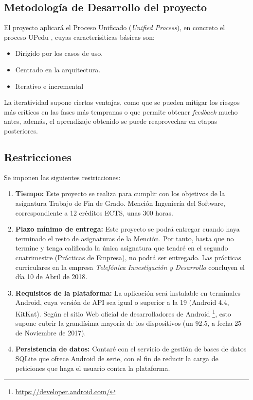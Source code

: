 \documentclass[twoside]{report}
\begin{document}
\subsection{Metodología de Desarrollo del proyecto}
El proyecto aplicará el Proceso Unificado (\textit{Unified Process}), en concreto el proceso UPedu \cite{upedu}, cuyas caracterísiticas básicas \cite{pgpup} son: 
\begin{itemize}
\item Dirigido por los casos de uso.
\item Centrado en la arquitectura.
\item Iterativo e incremental
\end{itemize}
La iteratividad supone ciertas ventajas, como que se pueden mitigar los riesgos más críticos en las fases más tempranas o que permite obtener \textit{feedback} mucho antes, además, el aprendizaje obtenido se puede reaprovechar en etapas posteriores.

\subsection{Restricciones}
Se imponen las siguientes restricciones:
\begin{enumerate}
\item \textbf{Tiempo:} Este proyecto se realiza para cumplir con los objetivos de la asignatura Trabajo de Fin de Grado. Mención Ingeniería del Software, correspondiente a 12 créditos ECTS, unas 300 horas.

\item \textbf{Plazo mínimo de entrega:} Este proyecto se podrá entregar cuando haya terminado el resto de asignaturas de la Mención. Por tanto, hasta que no termine y tenga calificada la única asignatura que tendré en el segundo cuatrimestre (Prácticas de Empresa), no podrá ser entregado. Las prácticas curriculares en la empresa \textit{Telefónica Investigación y Desarrollo} concluyen el día 10 de Abril de 2018.

\item \textbf{Requisitos de la plataforma:} La aplicación será instalable en terminales Android, cuya versión de API sea igual o superior a la 19 (Android 4.4, KitKat). Según el sitio Web oficial de desarrolladores de Android \footnote{\url{https://developer.android.com/}}, esto supone cubrir la grandísima mayoría de los dispositivos (un 92.5, a fecha 25 de Noviembre de 2017)\cite{androidversiondist}.

\item \textbf{Persistencia de datos: } Contaré con el servicio de gestión de bases de datos SQLite que ofrece Android de serie, con el fin de reducir la carga de peticiones que haga el usuario contra la plataforma.
\end{enumerate}
\end{document}
